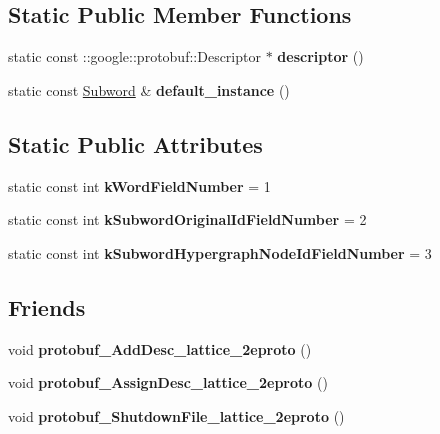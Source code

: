 \subsection*{Static Public Member Functions}
\begin{DoxyCompactItemize}
\item 
\hypertarget{classlattice_1_1Subword_a6b98d06b8741d7631593e8248acadb3f}{
static const ::google::protobuf::Descriptor $\ast$ {\bfseries descriptor} ()}
\label{classlattice_1_1Subword_a6b98d06b8741d7631593e8248acadb3f}

\item 
\hypertarget{classlattice_1_1Subword_a68365b2839b59dd8805f06a49797e67f}{
static const \hyperlink{classlattice_1_1Subword}{Subword} \& {\bfseries default\_\-instance} ()}
\label{classlattice_1_1Subword_a68365b2839b59dd8805f06a49797e67f}

\end{DoxyCompactItemize}
\subsection*{Static Public Attributes}
\begin{DoxyCompactItemize}
\item 
\hypertarget{classlattice_1_1Subword_a795d7849c138b766c0de1000929a9279}{
static const int {\bfseries kWordFieldNumber} = 1}
\label{classlattice_1_1Subword_a795d7849c138b766c0de1000929a9279}

\item 
\hypertarget{classlattice_1_1Subword_accafa8353a5d494473b8a7e9903b051d}{
static const int {\bfseries kSubwordOriginalIdFieldNumber} = 2}
\label{classlattice_1_1Subword_accafa8353a5d494473b8a7e9903b051d}

\item 
\hypertarget{classlattice_1_1Subword_a581a69ab155520b618cdd2146bc87752}{
static const int {\bfseries kSubwordHypergraphNodeIdFieldNumber} = 3}
\label{classlattice_1_1Subword_a581a69ab155520b618cdd2146bc87752}

\end{DoxyCompactItemize}
\subsection*{Friends}
\begin{DoxyCompactItemize}
\item 
\hypertarget{classlattice_1_1Subword_a19e63fb37025879e023cad88064187cf}{
void {\bfseries protobuf\_\-AddDesc\_\-lattice\_\-2eproto} ()}
\label{classlattice_1_1Subword_a19e63fb37025879e023cad88064187cf}

\item 
\hypertarget{classlattice_1_1Subword_a3b0386e09a9fefcf1bdce658cfc480b2}{
void {\bfseries protobuf\_\-AssignDesc\_\-lattice\_\-2eproto} ()}
\label{classlattice_1_1Subword_a3b0386e09a9fefcf1bdce658cfc480b2}

\item 
\hypertarget{classlattice_1_1Subword_a3c7b187721d0704ceb19ff889729d35a}{
void {\bfseries protobuf\_\-ShutdownFile\_\-lattice\_\-2eproto} ()}
\label{classlattice_1_1Subword_a3c7b187721d0704ceb19ff889729d35a}

\end{DoxyCompactItemize}


